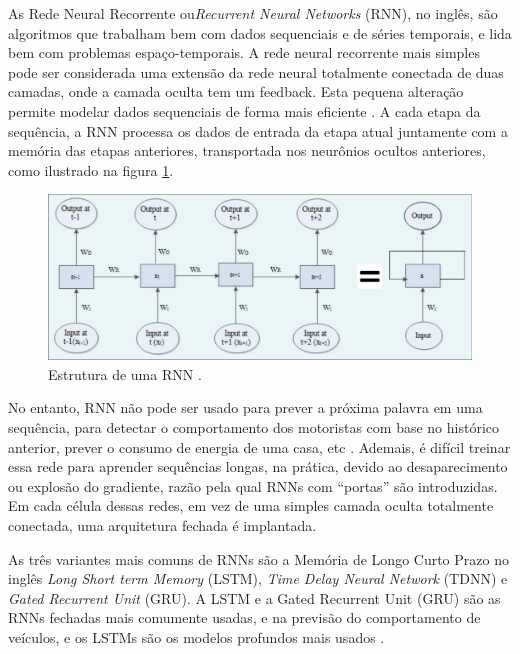  \label{rnn}

As Rede Neural Recorrente ou\textit{Recurrent Neural Networks} (RNN), no inglês, são algoritmos que trabalham bem com dados sequenciais e de séries temporais, e lida bem com problemas espaço-temporais. A rede neural recorrente mais simples pode ser considerada uma extensão da rede neural totalmente conectada de duas camadas, onde a camada oculta tem um feedback. Esta pequena alteração permite modelar dados sequenciais de forma mais eficiente \cite{software-cnn}. A cada etapa da sequência, a RNN processa os dados de entrada da etapa atual juntamente com a memória das etapas anteriores, transportada nos neurônios ocultos anteriores, como ilustrado na figura \ref{RNN}.

\begin{figure}[H]
\centering
\includegraphics[width=\textwidth]{Figures/RNN.png}
\caption{Estrutura de uma RNN \cite{software-cnn}.}
\label{RNN}
\end{figure}

No entanto, RNN não pode ser usado para prever a próxima palavra em uma sequência, para detectar o comportamento dos motoristas com base no histórico anterior, prever o consumo de energia de uma casa, etc \cite{software-cnn}. Ademais, é difícil treinar essa rede para aprender sequências longas, na prática, devido ao desaparecimento ou explosão do gradiente, razão pela qual RNNs com “portas” são introduzidas. Em cada célula dessas redes, em vez de uma simples camada oculta totalmente conectada, uma arquitetura fechada é implantada. 

As três variantes mais comuns de RNNs são a Memória de Longo Curto Prazo no inglês \textit{Long Short term Memory} (LSTM), \textit{Time Delay Neural Network} (TDNN) e \textit{Gated Recurrent Unit} (GRU).
A LSTM e a Gated Recurrent Unit (GRU) são as RNNs fechadas mais comumente usadas, e na previsão do comportamento de veículos, e os LSTMs são os modelos profundos mais usados \cite{software-review}.



